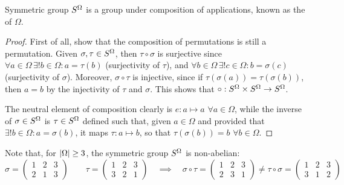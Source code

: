 \begin{lemma}{Symmetric group}{}
  $ S^{\Omega} $ is a group under composition of applications, known as the  of $ \Omega $.
\end{lemma}

\begin{proofbox}
  \begin{proof}
    First of all, show that the composition of permutations is still a permutation. Given $ \sigma , \tau \in S^{\Omega} $, then $ \tau \circ \sigma $ is surjective since $ \forall a \in \Omega \, \exists ! b \in \Omega : a = \tau(b) $ (surjectivity of $ \tau $), and $ \forall b \in \Omega \, \exists ! c \in \Omega : b = \sigma(c) $ (surjectivity of $ \sigma $). Moreover, $ \sigma \circ \tau $ is injective, since if $ \tau(\sigma(a)) = \tau(\sigma(b)) $, then $ a = b $ by the injectivity of $ \tau $ and $ \sigma $. This shows that $ \circ : S^{\Omega} \times S^{\Omega} \rightarrow S^{\Omega} $.

    The neutral element of composition clearly is $ e : a \mapsto a \,\, \forall a \in \Omega $, while the inverse of $ \sigma \in S^{\Omega} $ is $ \tau \in S^{\Omega} $ defined such that, given $ a \in \Omega $ and provided that $ \exists ! b \in \Omega : a = \sigma(b) $, it maps $ \tau : a \mapsto b $, so that $ \tau(\sigma(b)) = b \,\,\forall b \in \Omega $.
  \end{proof}
\end{proofbox}

Note that, for $ \left\lvert\Omega\right\rvert \geq 3 $, the symmetric group $ S^{\Omega} $ is non-abelian:
\begin{equation*}
  \sigma =
  \begin{pmatrix}
    1 & 2 & 3 \\
    2 & 1 & 3
  \end{pmatrix}
  \qquad
  \tau =
  \begin{pmatrix}
    1 & 2 & 3 \\
    3 & 2 & 1
  \end{pmatrix}
  \quad \implies \quad
  \sigma \circ \tau =
  \begin{pmatrix}
    1 & 2 & 3 \\
    2 & 3 & 1
  \end{pmatrix}
  \neq
  \tau \circ \sigma =
  \begin{pmatrix}
    1 & 2 & 3 \\
    3 & 1 & 2
  \end{pmatrix}
\end{equation*}

